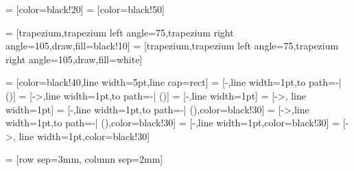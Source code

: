  = [color=black!20]
 = [color=black!50]

\newcommand{\dataRightAngle}{105}
\newcommand{\dataLeftAngle}{75}

 = [trapezium,trapezium left angle=\dataLeftAngle,trapezium right angle=\dataRightAngle,draw,fill=black!10]
 = [trapezium,trapezium left angle=\dataLeftAngle,trapezium right angle=\dataRightAngle,draw,fill=white]

 = [color=black!40,line width=5pt,line cap=rect]
 = [-,line width=1pt,to path={-| (\tikztotarget)}]
 = [->,line width=1pt,to path={-| (\tikztotarget)}]
 = [-,line width=1pt]
 = [->, line width=1pt]
 = [-,line width=1pt,to path={-| (\tikztotarget)},color=black!30]
 = [->,line width=1pt,to path={-| (\tikztotarget)},color=black!30]
 = [-,line width=1pt,color=black!30]
 = [->, line width=1pt,color=black!30]

 = [row sep=3mm, column sep=2mm]


\newcommand{\MultilineComponent}[2]
{
	\begin{minipage}{#1}
	\begin{center}
		#2
	\end{center}
	\end{minipage}
}

\newcommand{\TwolineComponent}[3]
{
	\begin{minipage}{#1}
	\begin{center}
		#2 \linebreak #3
	\end{center}
	\end{minipage}
}

\newcommand{\ThreelineComponent}[4]
{
	\begin{minipage}{#1}
	\begin{center}
		#2 \linebreak #3 \linebreak #4
	\end{center}
	\end{minipage}
}

